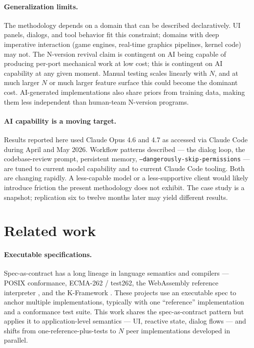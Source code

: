 \documentclass[10pt]{article}
\begin{document}
\paragraph{Generalization limits.} The methodology depends on a domain
that can be described declaratively. UI panels, dialogs, and tool
behavior fit this constraint; domains with deep imperative interaction
(game engines, real-time graphics pipelines, kernel code) may not. The
N-version revival claim is contingent on AI being capable of producing
per-port mechanical work at low cost; this is contingent on AI capability
at any given moment. Manual testing scales linearly with $N$, and at much
larger $N$ or much larger feature surface this could become the dominant
cost. AI-generated implementations also share priors from training data,
making them less independent than human-team N-version programs.

\paragraph{AI capability is a moving target.} Results reported here used
Claude Opus 4.6 and 4.7 as accessed via Claude Code during April and May
2026. Workflow patterns described --- the dialog loop, the
codebase-review prompt, persistent memory,
\texttt{--dangerously-skip-permissions} --- are tuned to current model
capability and to current Claude Code tooling. Both are changing rapidly.
A less-capable model or a less-supportive client would likely introduce
friction the present methodology does not exhibit. The case study is a
snapshot; replication six to twelve months later may yield different
results.

\section{Related work}
\label{sec:related}

\paragraph{Executable specifications.} Spec-as-contract has a long
lineage in language semantics and compilers --- POSIX conformance,
ECMA-262 / test262, the WebAssembly reference interpreter
\citep{haas2017webassembly}, and the K-Framework
\citep{rosu2010koverview}. These projects use an executable spec to
anchor multiple implementations, typically with one ``reference''
implementation and a conformance test suite. This work shares the
spec-as-contract pattern but applies it to application-level semantics
--- UI, reactive state, dialog flows --- and shifts from
one-reference-plus-tests to $N$ peer implementations developed in
parallel.
\end{document}
